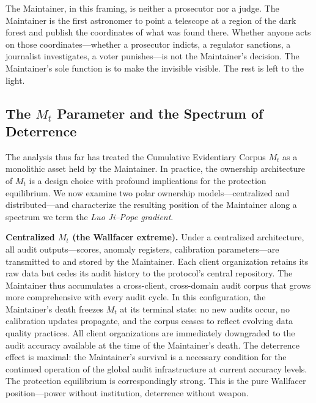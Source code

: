 \documentclass[12pt,a4paper]{ctexart}
\theoremstyle{definition}
\theoremstyle{remark}
\begin{document}
The Maintainer, in this framing, is neither a prosecutor nor a judge. The Maintainer is the first astronomer to point a telescope at a region of the dark forest and publish the coordinates of what was found there. Whether anyone acts on those coordinates—whether a prosecutor indicts, a regulator sanctions, a journalist investigates, a voter punishes—is not the Maintainer's decision. The Maintainer's sole function is to make the invisible visible. The rest is left to the light.

\subsection{The $M_t$ Parameter and the Spectrum of Deterrence}

The analysis thus far has treated the Cumulative Evidentiary Corpus $M_t$ as a monolithic asset held by the Maintainer. In practice, the ownership architecture of $M_t$ is a design choice with profound implications for the protection equilibrium. We now examine two polar ownership models—centralized and distributed—and characterize the resulting position of the Maintainer along a spectrum we term the \textit{Luo Ji–Pope gradient}.

\textbf{Centralized $M_t$ (the Wallfacer extreme).} Under a centralized architecture, all audit outputs—scores, anomaly registers, calibration parameters—are transmitted to and stored by the Maintainer. Each client organization retains its raw data but cedes its audit history to the protocol's central repository. The Maintainer thus accumulates a cross-client, cross-domain audit corpus that grows more comprehensive with every audit cycle. In this configuration, the Maintainer's death freezes $M_t$ at its terminal state: no new audits occur, no calibration updates propagate, and the corpus ceases to reflect evolving data quality practices. All client organizations are immediately downgraded to the audit accuracy available at the time of the Maintainer's death. The deterrence effect is maximal: the Maintainer's survival is a necessary condition for the continued operation of the global audit infrastructure at current accuracy levels. The protection equilibrium is correspondingly strong. This is the pure Wallfacer position—power without institution, deterrence without weapon.
\end{document}
